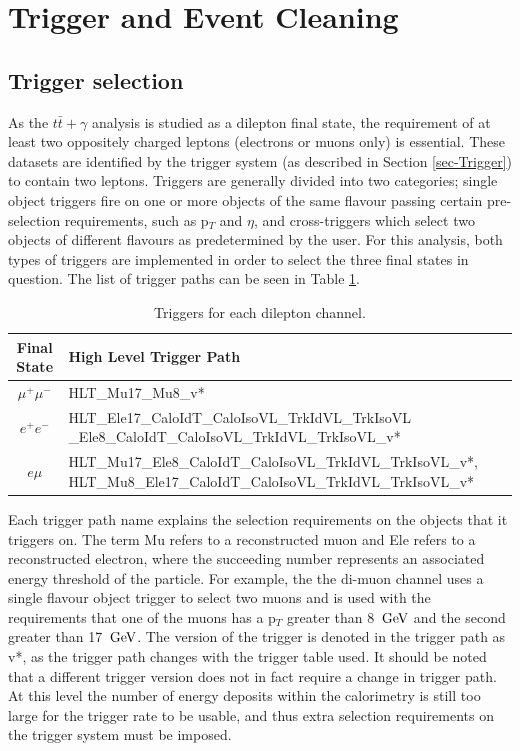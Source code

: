 \section{Trigger and Event Cleaning} \label{sec-TriggerAndEventCleaning}

\subsection{Trigger selection}

As the $t\bar{t}+\gamma$ analysis is studied as a dilepton final state, the requirement of at least two oppositely charged leptons (electrons or muons only) is essential. These datasets are identified by the trigger system (as described in Section \ref{sec-Trigger}) to contain two leptons. Triggers are generally divided into two categories; single object triggers fire on one or more objects of the same flavour passing certain pre-selection requirements, such as p$_T$ and $\eta$, and cross-triggers which select two objects of different flavours as predetermined by the user. For this analysis, both types of triggers are implemented in order to select the three final states in question. The list of trigger paths can be seen in Table \ref{tab-HLTriggers}. 

\begin{table} 
\begin{center}
\begin{tabular}{|c|p{11.5cm}|}
\hline
	\textbf{Final State} & \textbf{High Level Trigger Path} \\
\hline
	$\mu^+\mu^-$ & HLT\_Mu17\_Mu8\_v* \\
	$e^+e^-$ & HLT\_Ele17\_CaloIdT\_CaloIsoVL\_TrkIdVL\_TrkIsoVL
				\_Ele8\_CaloIdT\_CaloIsoVL\_TrkIdVL\_TrkIsoVL\_v* \\
	$e\mu$ & HLT\_Mu17\_Ele8\_CaloIdT\_CaloIsoVL\_TrkIdVL\_TrkIsoVL\_v*, HLT\_Mu8\_Ele17\_CaloIdT\_CaloIsoVL\_TrkIdVL\_TrkIsoVL\_v* \\
\hline	
\end{tabular}
\end{center}
\caption{Triggers for each dilepton channel.}
\label{tab-HLTriggers}
\end{table}

Each trigger path name explains the selection requirements on the objects that it triggers on. The term Mu refers to a reconstructed muon and Ele refers to a reconstructed electron, where the succeeding number represents an associated energy threshold of the particle. For example, the the di-muon channel uses a single flavour object trigger to select two muons and is used with the requirements that one of the muons has a p$_T$ greater than 8 $\,\text{Ge\hspace{-.08em}V}$ and the second greater than 17 $\,\text{Ge\hspace{-.08em}V}$. The version of the trigger is denoted in the trigger path as v*, as the trigger path changes with the trigger table used. It should be noted that a different trigger version does not in fact require a change in trigger path. At this level the number of energy deposits within the calorimetry is still too large for the trigger rate to be usable, and thus extra selection requirements on the trigger system must be imposed.

